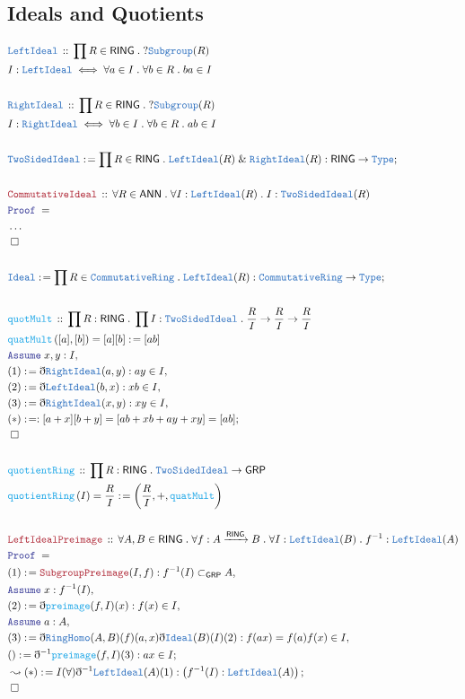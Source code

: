 \documentclass[12pt]{scrartcl}
\newcommand{\TYPE}[1]{\textcolor{NavyBlue}{\mathtt{#1}}}
\newcommand{\FUNC}[1]{\textcolor{Cerulean}{\mathtt{#1}}}
\newcommand{\LOGIC}[1]{\textcolor{Blue}{\mathtt{#1}}}
\newcommand{\THM}[1]{\textcolor{Maroon}{\mathtt{#1}}}
\renewcommand{\.}{\; . \;}
\newcommand{\de}{: \kern 0.1pc =}
\newcommand{\Act}[1]{\left( #1 \right)}
\newcommand{\Theorem}[2]{& \THM{#1} \, :: \, #2 \\ & \Proof = \\ }
\newcommand{\DeclareType}[2]{& \TYPE{#1} \, :: \, #2 \\}
\newcommand{\DefineType}[3]{& #1 : \TYPE{#2} \iff #3 \\}
\newcommand{\DeclareFunc}[2]{& \FUNC{#1} \, :: \, #2 \\}
\newcommand{\DefineNamedFunc}[4]{&  \FUNC{#1}\Act{#2} = #3 \de #4 \\}
\newcommand{\Page}[1]{ \begin{align*} #1 \end{align*}   }
\newcommand{ \bd }{ \ByDef }
\newcommand{\NoProof}{ & \ldots \\ \EndProof}
\renewcommand{\And}{\; \& \;}
\newcommand{\Type}{\TYPE{Type}}
\newcommand{\Say}[3]{& #1 \de #2 : #3, \\}
\newcommand{\Conclude}[3]{& #1 \de #2 : #3; \\}
\newcommand{\DeriveConclude}[3]{& \leadsto #1 \de #2 : #3 ; \\}
\newcommand{\Assume}[2]{& \LOGIC{Assume} \; #1 : #2, \\}
\newcommand{\QED}{\; \square}
\newcommand{\EndProof}{& \QED \\}
\newcommand{\ByDef}{\eth}
\newcommand{\Proof}{\LOGIC{Proof} \; }
\newcommand{\Arrow}[1]{\xrightarrow{#1}}
\newcommand{\Sgrp}{\subset_{\mathsf{GRP}}}
\newcommand{\GRP}{\mathsf{GRP}}
\newcommand{\CR}{\TYPE{CommutativeRing}}
\newcommand{\Ideal}{\TYPE{Ideal}}
\newcommand{\RING}{\mathsf{RING}}
\newcommand{\ANN}{\mathsf{ANN}}
\begin{document}
\subsection{Ideals and Quotients}
\Page{
	\DeclareType{LeftIdeal}{\prod R \in \RING \. ?\TYPE{Subgroup}(R)}
	\DefineType{I}{LeftIdeal}{\forall a \in I \. \forall b \in R \. ba \in I}
	\\
	\DeclareType{RightIdeal}{\prod R \in \RING \. ?\TYPE{Subgroup}(R)}
	\DefineType{I}{RightIdeal}{\forall b \in I \. \forall b \in R \. ab \in I}
	\\
	\Conclude{\TYPE{TwoSidedIdeal}}{\prod R \in \RING \. \TYPE{LeftIdeal}(R) \And \TYPE{RightIdeal}(R)}{\RING \to \Type}
	\\
	\Theorem{CommutativeIdeal}{\forall R \in \ANN \. \forall I : \TYPE{LeftIdeal}(R) \. I : \TYPE{TwoSidedIdeal}(R) }
	\NoProof
	\\
	\Conclude{\Ideal}{\prod R \in \CR \. \TYPE{LeftIdeal}(R)}{\CR \to \Type}
	\\
	\DeclareFunc{quotMult}{\prod R : \RING \. \prod I : \TYPE{TwoSidedIdeal} \. \frac{R}{I} \to \frac{R}{I} \to \frac{R}{I}}
	\DefineNamedFunc{quatMult}{[a],[b]}{[a][b]}{[ab]}
	\Assume{x,y}{I}
	\Say{(1)}{\bd \TYPE{RightIdeal}(a,y)}{ay \in I}
	\Say{(2)}{ \bd \TYPE{LeftIdeal}(b,x) }{xb \in I}
	\Say{(3)}{\bd \TYPE{RightIdeal}(x,y)}{xy \in I}
	\Conclude{(*)}{ }{ [a + x][b + y] = [ab + xb + ay  + xy] = [ab]}
	\EndProof
	\\
	\DeclareFunc{quotientRing}{\prod R : \RING \. \TYPE{TwoSidedIdeal} \to \GRP}
	\DefineNamedFunc{quotientRing}{I}{\frac{R}{I}}{\left(\frac{R}{I},+,\FUNC{quatMult}\right)}
	\\
	\Theorem{LeftIdealPreimage}{ \forall A,B \in \RING \.  \forall f : A \Arrow{\RING} B \.  \forall I : \TYPE{LeftIdeal}(B) \. f^{-1} : \TYPE{LeftIdeal}(A)}
	\Say{(1)}{\THM{SubgroupPreimage}(I,f)}{f^{-1}(I) \Sgrp A}
	\Assume{x}{f^{-1}(I)}
	\Say{(2)}{\bd \FUNC{preimage}(f,I)(x)}{f(x) \in I}
	\Assume{a}{A}
	\Say{(3)}{\bd \TYPE{RingHomo}(A,B)(f)(a,x)\bd \TYPE{Ideal}(B)(I)(2)}{f(ax) = f(a)f(x) \in I}
	\Conclude{()}{ \bd^{-1} \FUNC{preimage}(f,I)(3)}{ ax \in I}
	\DeriveConclude{(*)}{ I(\forall)\bd^{-1}\TYPE{LeftIdeal}(A)(1) }{\left(f^{-1}(I) : \TYPE{LeftIdeal}(A)\right)}
	\EndProof
}
\end{document}
